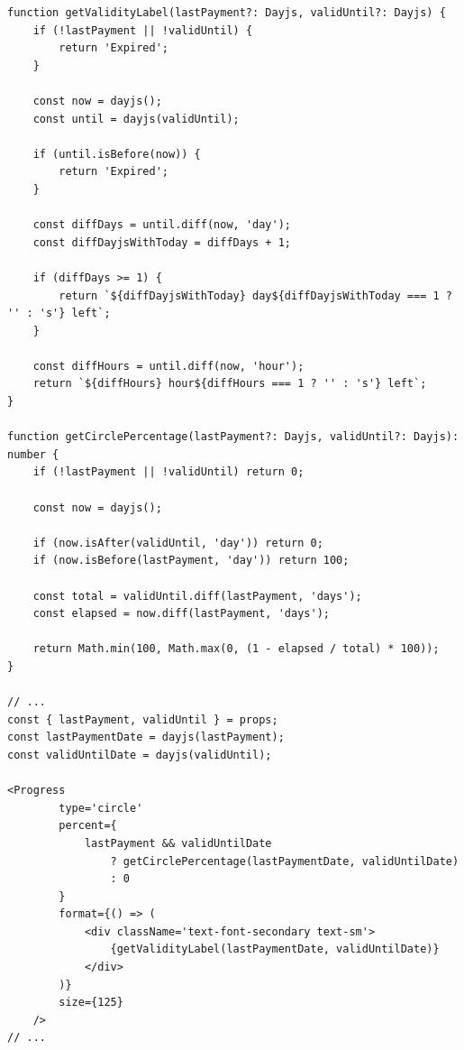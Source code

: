 \documentclass[../../spr.tex]{subfiles}
\begin{document}
\begin{lstlisting}[caption=Przykład logiki obliczeniowej w komponencie. Funkcje służą do wyznaczania wskaźników statusu karnetu dla komponentu \textit{Progress} z \textit{Ant Design}.]
function getValidityLabel(lastPayment?: Dayjs, validUntil?: Dayjs) {
    if (!lastPayment || !validUntil) {
        return 'Expired';
    }

    const now = dayjs();
    const until = dayjs(validUntil);

    if (until.isBefore(now)) {
        return 'Expired';
    }

    const diffDays = until.diff(now, 'day');
    const diffDayjsWithToday = diffDays + 1;

    if (diffDays >= 1) {
        return `${diffDayjsWithToday} day${diffDayjsWithToday === 1 ? '' : 's'} left`;
    }

    const diffHours = until.diff(now, 'hour');
    return `${diffHours} hour${diffHours === 1 ? '' : 's'} left`;
}

function getCirclePercentage(lastPayment?: Dayjs, validUntil?: Dayjs): number {
    if (!lastPayment || !validUntil) return 0;

    const now = dayjs();

    if (now.isAfter(validUntil, 'day')) return 0;
    if (now.isBefore(lastPayment, 'day')) return 100;

    const total = validUntil.diff(lastPayment, 'days');
    const elapsed = now.diff(lastPayment, 'days');

    return Math.min(100, Math.max(0, (1 - elapsed / total) * 100));
}

// ...
const { lastPayment, validUntil } = props;
const lastPaymentDate = dayjs(lastPayment);
const validUntilDate = dayjs(validUntil);

<Progress
        type='circle'
        percent={
            lastPayment && validUntilDate
                ? getCirclePercentage(lastPaymentDate, validUntilDate)
                : 0
        }
        format={() => (
            <div className='text-font-secondary text-sm'>
                {getValidityLabel(lastPaymentDate, validUntilDate)}
            </div>
        )}
        size={125}
    />
// ...
\end{lstlisting}
\end{document}
